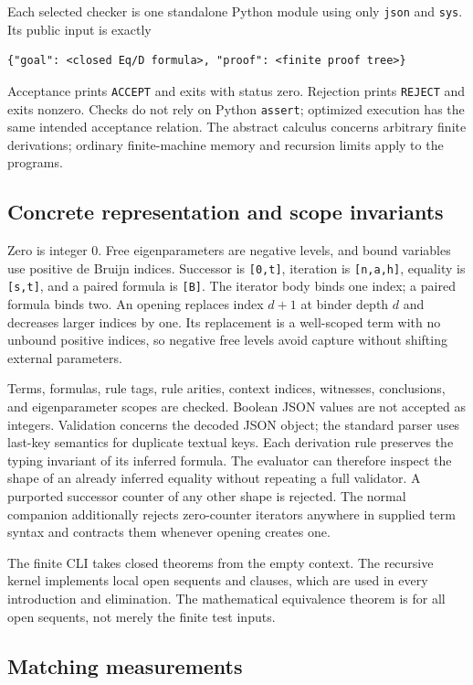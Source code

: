\documentclass[11pt]{article}
\theoremstyle{definition}
\DeclareRobustCommand{\file}[1]{\nolinkurl{#1}}
\begin{document}
Each selected checker is one standalone Python module using only
\file{json} and \file{sys}. Its public input is exactly
\begin{lstlisting}
{"goal": <closed Eq/D formula>, "proof": <finite proof tree>}
\end{lstlisting}
Acceptance prints \file{ACCEPT} and exits with status zero. Rejection
prints \file{REJECT} and exits nonzero. Checks do not rely on Python
\file{assert}; optimized execution has the same intended acceptance
relation. The abstract calculus concerns arbitrary finite derivations;
ordinary finite-machine memory and recursion limits apply to the programs.

\subsection{Concrete representation and scope invariants}

Zero is integer $0$. Free eigenparameters are negative levels, and bound
variables use positive de Bruijn indices. Successor is \file{[0,t]},
iteration is \file{[n,a,h]}, equality is \file{[s,t]}, and a paired formula
is \file{[B]}. The iterator body binds one index; a paired formula binds
two. An opening replaces index $d+1$ at binder depth $d$ and decreases
larger indices by one. Its replacement is a well-scoped term with no
unbound positive indices, so negative free levels avoid capture without
shifting external parameters.

Terms, formulas, rule tags, rule arities, context indices, witnesses,
conclusions, and eigenparameter scopes are checked. Boolean JSON values
are not accepted as integers. Validation concerns the decoded JSON object;
the standard parser uses last-key semantics for duplicate textual keys. Each derivation rule preserves the typing
invariant of its inferred formula. The evaluator can therefore inspect
the shape of an already inferred equality without repeating a full
validator. A purported successor counter of any other shape is rejected.
The normal companion additionally rejects zero-counter iterators anywhere
in supplied term syntax and contracts them whenever opening creates one.

The finite CLI takes closed theorems from the empty context. The recursive
kernel implements local open sequents and clauses, which are used in every
introduction and elimination. The mathematical equivalence theorem is for
all open sequents, not merely the finite test inputs.

\subsection{Matching measurements}
\end{document}
